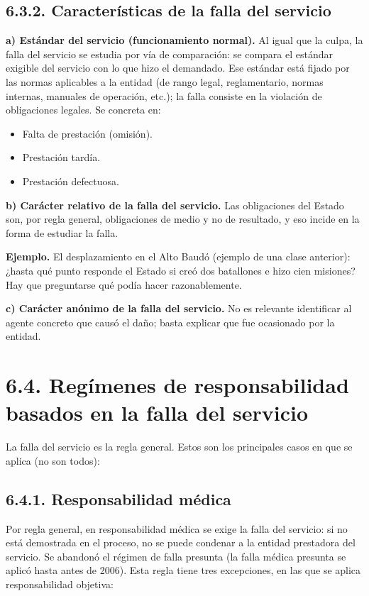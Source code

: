 \subsection{6.3.2. Características de la falla del servicio}
\textbf{a) Estándar del servicio (funcionamiento normal).} Al igual que la culpa, la falla del servicio se estudia por vía de comparación: se compara el estándar exigible del servicio con lo que hizo el demandado. Ese estándar está fijado por las normas aplicables a la entidad (de rango legal, reglamentario, normas internas, manuales de operación, etc.); la falla consiste en la violación de obligaciones legales. Se concreta en:

\begin{itemize}
\item Falta de prestación (omisión).
\item Prestación tardía.
\item Prestación defectuosa.
\end{itemize}
\textbf{b) Carácter relativo de la falla del servicio.} Las obligaciones del Estado son, por regla general, obligaciones de medio y no de resultado, y eso incide en la forma de estudiar la falla.

\begin{ejemplo}
\textcolor[HTML]{4F6228}{\textbf{Ejemplo. }}El desplazamiento en el Alto Baudó (ejemplo de una clase anterior): ¿hasta qué punto responde el Estado si creó dos batallones e hizo cien misiones? Hay que preguntarse qué podía hacer razonablemente.
\end{ejemplo}
\textbf{c) Carácter anónimo de la falla del servicio.} No es relevante identificar al agente concreto que causó el daño; basta explicar que fue ocasionado por la entidad.

\section{6.4. Regímenes de responsabilidad basados en la falla del servicio}
La falla del servicio es la regla general. Estos son los principales casos en que se aplica (no son todos):

\subsection{6.4.1. Responsabilidad médica}
Por regla general, en responsabilidad médica se exige la falla del servicio: si no está demostrada en el proceso, no se puede condenar a la entidad prestadora del servicio. Se abandonó el régimen de falla presunta (la falla médica presunta se aplicó hasta antes de 2006). Esta regla tiene tres excepciones, en las que se aplica responsabilidad objetiva:


